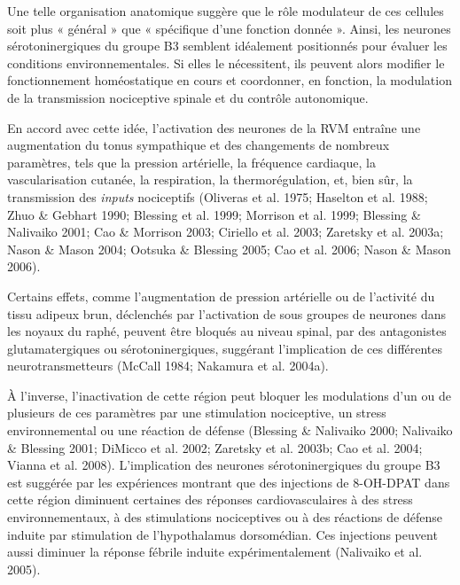 \documentclass[a4paper,12pt,twoside]{report}
\begin{document}
\bigskip 

Une telle organisation anatomique suggère que le rôle modulateur de ces cellules soit plus « général » que « spécifique d’une fonction donnée ». Ainsi, les neurones sérotoninergiques du groupe B3 semblent idéalement positionnés pour évaluer les conditions environnementales. Si elles le nécessitent, ils peuvent alors modifier le fonctionnement homéostatique en cours et coordonner, en fonction, la modulation de la transmission nociceptive spinale et du contrôle autonomique. 

En accord avec cette idée, l’activation des neurones de la RVM entraîne une augmentation du tonus sympathique et des changements de nombreux paramètres, tels que la pression artérielle, la fréquence cardiaque, la vascularisation cutanée, la respiration, la thermorégulation, et, bien sûr, la transmission des \textit{inputs} nociceptifs (Oliveras et al. 1975; Haselton et al. 1988; Zhuo \& Gebhart 1990; Blessing et al. 1999; Morrison et al. 1999; Blessing \& Nalivaiko 2001; Cao \& Morrison 2003; Ciriello et al. 2003; Zaretsky et al. 2003a; Nason \& Mason 2004; Ootsuka \& Blessing 2005; Cao et al. 2006; Nason \& Mason 2006). 

Certains effets, comme l’augmentation de pression artérielle ou de l’activité du tissu adipeux brun, déclenchés par l’activation de sous groupes de neurones dans les noyaux du raphé, peuvent être bloqués au niveau spinal, par des antagonistes glutamatergiques ou sérotoninergiques, suggérant l’implication de ces différentes neurotransmetteurs (McCall 1984; Nakamura et al. 2004a).

\`A l’inverse, l’inactivation de cette région peut bloquer les modulations d’un ou de plusieurs de ces paramètres par une stimulation nociceptive, un stress environnemental ou une réaction de défense (Blessing \& Nalivaiko 2000; Nalivaiko \& Blessing 2001; DiMicco et al. 2002; Zaretsky et al. 2003b; Cao et al. 2004; Vianna et al. 2008). L’implication des neurones sérotoninergiques du groupe B3 est suggérée par les expériences montrant que des injections de 8-OH-DPAT dans cette région diminuent certaines des réponses cardiovasculaires à des stress environnementaux, à des stimulations nociceptives ou à des réactions de défense induite par stimulation de l’hypothalamus dorsomédian. Ces injections peuvent aussi diminuer la réponse fébrile induite expérimentalement (Nalivaiko et al. 2005).

\bigskip 
\end{document}
